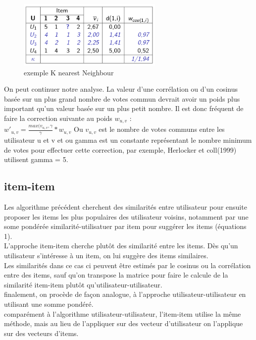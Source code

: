 \documentclass[oneside]{book}
\begin{document}
\begin{figure}[!ht]
\centering
\includegraphics[width = 7cm]{knn.png}
\caption{exemple K nearest Neighbour}
\label{fig:knn_exemple}
\end{figure}

On peut continuer notre analyse. La valeur d'une corrélation ou d'un cosinus basée sur un plus grand nombre de votes commun devrait avoir un poids plus important qu'un valeur basée sur un plus petit nombre. Il est donc fréquent de faire la correction suivante au poids $w_{u,v}$ : \\

\centering
$w'_{u,v} = \frac{max(v_{u,v}, \gamma}{\gamma} * w_{u,v}$
\justify
Ou $v_{u,v}$ est le nombre de votes communs entre les utilisateur u et v et ou gamma est un constante représentant le nombre minimum de votes pour effectuer cette correction, par exemple, Herlocker et coll(1999) utilisent gamma  = 5.
\subsection{item-item}
Les algorithme précédent cherchent des similarités entre utilisateur pour ensuite proposer les items les plus populaires des utilisateur voisins, notamment par une some pondérée similarité-utilisatuer par item pour suggérer les items (équations 1). \\

L'approche item-item cherche plutôt des similarité entre les items. Dès qu'un utilisateur s'intéresse à un item, on lui suggère des items similaires. \\

Les similarités dans ce cas ci peuvent être estimés par le cosinus ou la corrélation entre des items, sauf qu'on transpose la matrice pour faire le calcule de la similarité item-item plutôt qu'utilisateur-utilisateur.\\

finalement, on procède de façon analogue, à l'approche utilisateur-utilisateur en utilisant une somme pondéré.\\

comparément à l'algorithme utilisateur-utilisateur, l'item-item utilise la même méthode, mais au lieu de l'appliquer sur des vecteur d'utilisateur on l'applique sur des vecteurs d'items. \\
\end{document}
